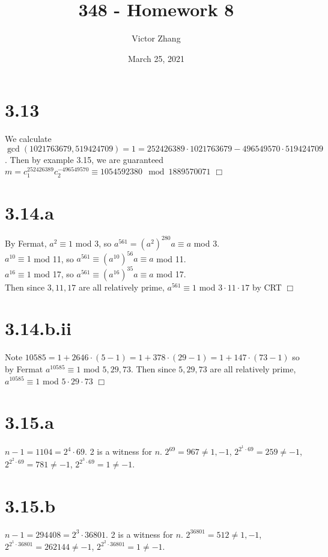 \documentclass{article}
\title{348 - Homework 8}
\author{Victor Zhang}
\date{March 25, 2021}
\begin{document}
\maketitle

\section*{3.13}
We calculate $\gcd(1021763679,519424709) = 1 = 252426389\cdot1021763679 - 496549570\cdot519424709$. Then by example 3.15, we are guaranteed $m = c_1^{252426389} c_2^{-496549570} \equiv 1054592380 \mod 1889570071$ $\Box$

\section*{3.14.a}
By Fermat, $a^2 \equiv 1$ mod 3, so $a^{561} = (a^2)^{280}a \equiv a$ mod 3.\\
$a^{10} \equiv 1$ mod 11, so $a^{561} \equiv (a^{10})^{56}a \equiv a$ mod 11.\\
$a^{16} \equiv 1$ mod 17, so $a^{561} \equiv (a^{16})^{35}a \equiv a$ mod 17.\\
Then since $3,11,17$ are all relatively prime, $a^{561} \equiv 1$ mod $3 \cdot 11 \cdot 17$ by CRT $\Box$

\section*{3.14.b.ii}
Note $10585 = 1 + 2646 \cdot (5-1) = 1 + 378 \cdot (29-1) = 1 + 147 \cdot (73-1)$ so by Fermat $a^{10585} \equiv 1 $ mod $5,29,73$. Then since $5,29,73$ are all relatively prime, $a^{10585} \equiv 1$ mod $5\cdot29\cdot73$ $\Box$

\section*{3.15.a}
$n-1 = 1104 = 2^4 \cdot 69$. 2 is a witness for $n$. $2^{69} = 967 \neq 1,-1$, $2^{2^1\cdot 69} = 259 \neq -1$, $2^{2^2\cdot 69} = 781 \neq -1$, $2^{2^3\cdot 69} = 1 \neq -1$.

\section*{3.15.b}
$n-1 = 294408 = 2^3 \cdot 36801$. 2 is a witness for $n$. $2^{36801} = 512 \neq 1,-1$, $2^{2^1\cdot 36801} = 262144 \neq -1$, $2^{2^2\cdot 36801} = 1 \neq -1$.
\end{document}
